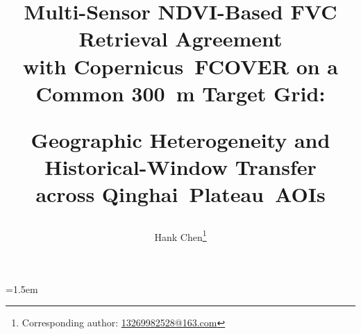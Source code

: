 \documentclass[a4paper,10pt,twocolumn]{article}
\title{%
  {\fontsize{17}{19}\selectfont\bfseries
  Multi-Sensor NDVI-Based FVC Retrieval Agreement\\
  with \mbox{Copernicus FCOVER} on a Common \mbox{300 m} Target Grid:\par}
  \vspace{0.55em}
  {\fontsize{13}{15}\selectfont\normalfont
  Geographic Heterogeneity and Historical-Window Transfer\\
  across \mbox{Qinghai Plateau AOIs}\par}
}
\author{Hank Chen\thanks{Corresponding author: \href{mailto:13269982528@163.com}{13269982528@163.com}}}
\date{}
\begin{document}
\emergencystretch=1.5em
\pagestyle{plain}
\maketitle








\end{document}
